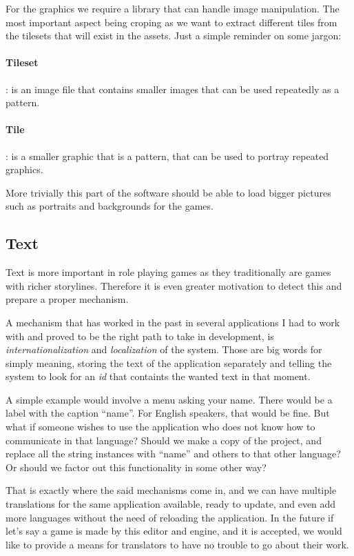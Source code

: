 For the graphics we require a library that can handle image manipulation. The
most important aspect being croping as we want to extract different tiles from
the tilesets that will exist in the assets. Just a simple reminder on some
jargon:

\paragraph{Tileset}: is an image file that contains smaller images that can be
used repeatedly as a pattern. 

\paragraph{Tile}: is a smaller graphic that is a pattern, that can be used to 
portray repeated graphics.

More trivially this part of the software should be able to load bigger pictures
such as portraits and backgrounds for the games. 

\subsection{Text}

Text is more important in role playing games as they traditionally are games
with richer storylines. Therefore it is even greater motivation to detect this
and prepare a proper mechanism.

A mechanism that has worked in the past in several applications I had to work
with and proved to be the right path to take in development, is
\textit{internationalization} and \textit{localization} of the system. Those 
are big words for simply meaning, storing the text of the application separately
and telling the system to look for an \textit{id} that containts the wanted 
text in that moment. 

A simple example would involve a menu asking your name. There would be a label
with the caption ``name''. For English speakers, that would be fine. But what
if someone wishes to use the application who does not know how to communicate
in that language? Should we make a copy of the project, and replace all the 
string instances with ``name'' and others to that other language? Or should we
factor out this functionality in some other way?

That is exactly where the said mechanisms come in, and we can have multiple
translations for the same application available, ready to update, and even add
more languages without the need of reloading the application. In the future if
let's say a game is made by this editor and engine, and it is accepted, we
would like to provide a means for translators to have no trouble to go about
their work.

